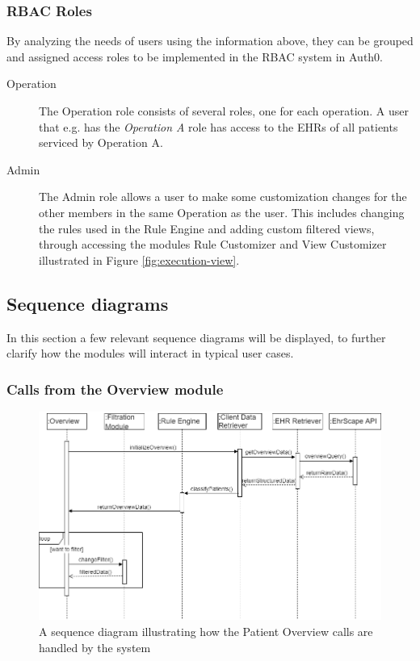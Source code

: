 \documentclass{article}
\begin{document}
\subsubsection{RBAC Roles}
By analyzing the needs of users using the information above, they can be grouped and assigned access roles to be implemented in the RBAC system in Auth0.

\begin{description}
\item [Operation] The Operation role consists of several roles, one for each operation. A user that e.g. has the \emph{Operation A} role has access to the EHRs of all patients serviced by Operation A.
\item [Admin] The Admin role allows a user to make some customization changes for the other members in the same Operation as the user. This includes changing the rules used in the Rule Engine and adding custom filtered views, through accessing the modules Rule Customizer and View Customizer illustrated in Figure \ref{fig:execution-view}.
\end{description}


\subsection{Sequence diagrams}
In this section a few relevant sequence diagrams will be displayed, to further clarify how the modules will interact in typical user cases.

\subsubsection{Calls from the Overview module}
\begin{figure}[h]
    \centering
    \includegraphics[scale = 0.45]{overview-sequence}
    \caption{A sequence diagram illustrating how the Patient Overview calls are handled by the system}
    \label{fig:overview-sequence}
\end{figure}
\end{document}
